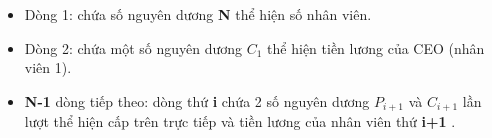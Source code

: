 \begin{itemize}
	\item Dòng 1: chứa số nguyên dương \textbf{ N } thể hiện số nhân viên.
	\item Dòng 2: chứa một số nguyên dương \textbf{ $C_{1}$} thể hiện tiền lương của CEO (nhân viên 1).
	\item \textbf{N-1 } dòng tiếp theo: dòng thứ \textbf{ i } chứa 2 số nguyên dương \textbf{ $P_{i+1}$} và \textbf{ $C_{i+1}$} lần lượt thể hiện cấp trên trực tiếp và tiền lương của nhân viên thứ \textbf{ i+1 } .
\end{itemize}